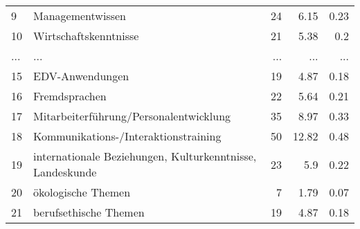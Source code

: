 \begin{longtable}{lXrrr}
        9 & \multicolumn{1}{X}{Managementwissen} & %
          \num{24} &
          \num[round-mode=places,round-precision=2]{6.15} &
          \num[round-mode=places,round-precision=2]{0.23} \\
        10 & \multicolumn{1}{X}{Wirtschaftskenntnisse} & %
          \num{21} &
          \num[round-mode=places,round-precision=2]{5.38} &
          \num[round-mode=places,round-precision=2]{0.2} \\
       ... & ... & ... & ... & ... \\
        15 & \multicolumn{1}{X}{EDV-Anwendungen} & %
          \num{19} &
          \num[round-mode=places,round-precision=2]{4.87} &
          \num[round-mode=places,round-precision=2]{0.18} \\

        16 & \multicolumn{1}{X}{Fremdsprachen} & %
          \num{22} &
          \num[round-mode=places,round-precision=2]{5.64} &
          \num[round-mode=places,round-precision=2]{0.21} \\

        17 & \multicolumn{1}{X}{Mitarbeiterführung/Personalentwicklung} & %
          \num{35} &
          \num[round-mode=places,round-precision=2]{8.97} &
          \num[round-mode=places,round-precision=2]{0.33} \\

        18 & \multicolumn{1}{X}{Kommunikations-/Interaktionstraining} & %
          \num{50} &
          \num[round-mode=places,round-precision=2]{12.82} &
          \num[round-mode=places,round-precision=2]{0.48} \\

        19 & \multicolumn{1}{X}{internationale Beziehungen, Kulturkenntnisse, Landeskunde} & %
          \num{23} &
          \num[round-mode=places,round-precision=2]{5.9} &
          \num[round-mode=places,round-precision=2]{0.22} \\

        20 & \multicolumn{1}{X}{ökologische Themen} & %
          \num{7} &
          \num[round-mode=places,round-precision=2]{1.79} &
          \num[round-mode=places,round-precision=2]{0.07} \\

        21 & \multicolumn{1}{X}{berufsethische Themen} & %
          \num{19} &
          \num[round-mode=places,round-precision=2]{4.87} &
          \num[round-mode=places,round-precision=2]{0.18} \\


\end{longtable}
